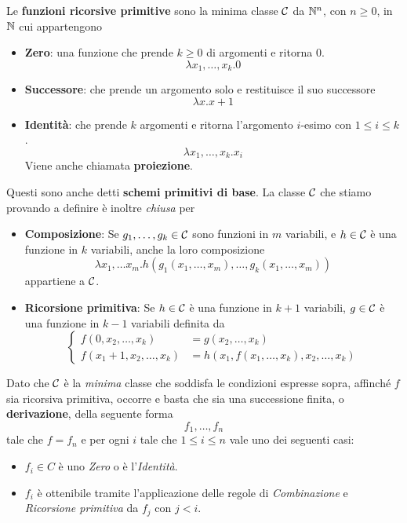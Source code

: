 \begin{definition}
	Le \textbf{funzioni ricorsive primitive} sono la minima
	classe $\mathcal{C}$ da $\mathbb{N}^n$, con $n \geq 0$, in $\mathbb{N}$ cui
	appartengono
	\begin{itemize}
		\item \textbf{Zero}: una funzione che prende $k \geq 0$
		      di argomenti e ritorna 0.
		      \[ \lambda x_1, \dots, x_k . 0 \]
		\item \textbf{Successore}: che prende un argomento solo
		      e restituisce il suo successore
		      \[ \lambda x . x + 1 \]
		\item \textbf{Identità}: che prende $k$ argomenti e
		      ritorna l'argomento $i$-esimo con $1\leq i\leq k$.
		      \[ \lambda x_1, \dots, x_k . x_i \]
		      Viene anche chiamata \textbf{proiezione}.
	\end{itemize}
	Questi sono anche detti \textbf{schemi primitivi di base}.
	La classe $\mathcal{C}$ che stiamo provando a definire è inoltre
	\emph{chiusa} per
	\begin{itemize}
		\item \textbf{Composizione}: Se $g_1, \dots, g_k \in \mathcal{C}$
		      sono funzioni in $m$ variabili, e $h \in \mathcal{C}$ è
		      una funzione in $k$ variabili, anche la loro
		      composizione
		      \[
			      \lambda x_1, \dots x_m .
			      h(g_1(x_1, \dots, x_m), \dots,
			      g_k(x_1, \dots, x_m)
			      )
		      \]
		      appartiene a $\mathcal{C}$.
		\item \textbf{Ricorsione primitiva}: Se $h \in \mathcal{C}$
		      è una funzione in $k+1$ variabili, $g \in \mathcal{C}$
		      è una funzione in $k-1$ variabili definita da
		      \[
			      \begin{cases}
				      f(0, x_2, \dots, x_k)       & =
				      g(x_2, \dots, x_k)              \\
				      f(x_1 + 1, x_2, \dots, x_k) & =
				      h(x_1, f(x_1, \dots, x_k),
				      x_2, \dots, x_k)
			      \end{cases}
		      \]
	\end{itemize}
\end{definition}

\begin{tcolorbox}
	Dato che $\mathcal{C}$ è la \emph{minima} classe che soddisfa le
	condizioni espresse sopra, affinché $f$ sia ricorsiva
	primitiva, occorre e basta che sia una successione finita,
	o \textbf{derivazione}, della seguente forma
	\[ f_1, \dots, f_n \]
	tale che $f = f_n$ e per ogni $i$ tale che
	$1 \leq i \leq n$ vale uno dei seguenti casi:
	\begin{itemize}
		\item $f_i \in C$ è uno \emph{Zero} o è
		      l'\emph{Identità}.
		\item $f_i$ è ottenibile tramite l'applicazione delle
		      regole di \emph{Combinazione} e
		      \emph{Ricorsione primitiva} da $f_j$ con $j < i$.
	\end{itemize}
\end{tcolorbox}

